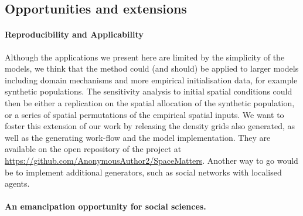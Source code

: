 \documentclass[3p,times,procedia]{elsarticle}
\begin{document}

\subsection{Opportunities and extensions}


\paragraph{Reproducibility and Applicability} 

Although the applications we present here are limited by the simplicity of the models, we think that the method could (and should) be applied to larger models including domain mechanisms and more empirical initialisation data, for example synthetic populations. The sensitivity analysis to initial spatial conditions could then be either a replication on the spatial allocation of the synthetic population, or a series of spatial permutations of the empirical spatial inputs.
We want to foster this extension of our work by releasing the density grids also generated, as well as the generating work-flow and the model implementation. They are available on the open repository of the project at \url{https://github.com/AnonymousAuthor2/SpaceMatters}. Another way to go would be to implement additional generators, such as social networks \citep{alizadeh2016generating} with localised agents. 


\paragraph{An emancipation opportunity for social sciences.}

\end{document}
